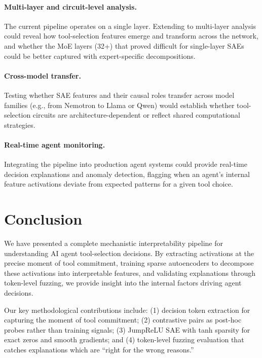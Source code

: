 \documentclass[runningheads]{llncs}
\begin{document}
\paragraph{Multi-layer and circuit-level analysis.} The current pipeline operates on a single layer. Extending to multi-layer analysis could reveal how tool-selection features emerge and transform across the network, and whether the MoE layers (32+) that proved difficult for single-layer SAEs could be better captured with expert-specific decompositions.

\paragraph{Cross-model transfer.} Testing whether SAE features and their causal roles transfer across model families (e.g., from Nemotron to Llama or Qwen) would establish whether tool-selection circuits are architecture-dependent or reflect shared computational strategies.

\paragraph{Real-time agent monitoring.} Integrating the pipeline into production agent systems could provide real-time decision explanations and anomaly detection, flagging when an agent's internal feature activations deviate from expected patterns for a given tool choice.


\section{Conclusion}
\label{sec:conclusion}

We have presented a complete mechanistic interpretability pipeline for understanding AI agent tool-selection decisions. By extracting activations at the precise moment of tool commitment, training sparse autoencoders to decompose these activations into interpretable features, and validating explanations through token-level fuzzing, we provide insight into the internal factors driving agent decisions.

Our key methodological contributions include: (1) decision token extraction for capturing the moment of tool commitment; (2) contrastive pairs as post-hoc probes rather than training signals; (3) JumpReLU SAE with tanh sparsity for exact zeros and smooth gradients; and (4) token-level fuzzing evaluation that catches explanations which are ``right for the wrong reasons.''
\end{document}
